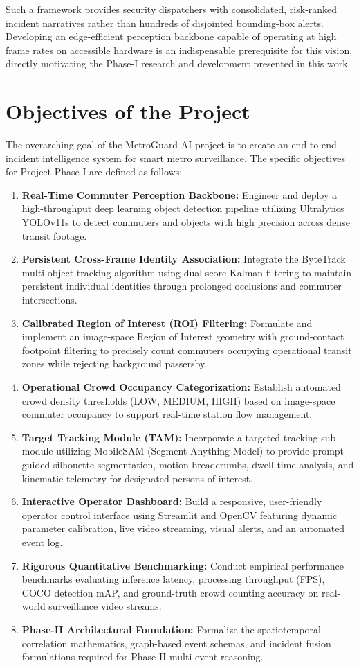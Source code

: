 \documentclass[12pt,a4paper]{report}
\begin{document}
Such a framework provides security dispatchers with consolidated, risk-ranked incident narratives rather than hundreds of disjointed bounding-box alerts. Developing an edge-efficient perception backbone capable of operating at high frame rates on accessible hardware is an indispensable prerequisite for this vision, directly motivating the Phase-I research and development presented in this work.

\section{Objectives of the Project}
The overarching goal of the MetroGuard AI project is to create an end-to-end incident intelligence system for smart metro surveillance. The specific objectives for Project Phase-I are defined as follows:
\begin{enumerate}
    \item \textbf{Real-Time Commuter Perception Backbone:} Engineer and deploy a high-throughput deep learning object detection pipeline utilizing Ultralytics YOLOv11s to detect commuters and objects with high precision across dense transit footage.
    \item \textbf{Persistent Cross-Frame Identity Association:} Integrate the ByteTrack multi-object tracking algorithm using dual-score Kalman filtering to maintain persistent individual identities through prolonged occlusions and commuter intersections.
    \item \textbf{Calibrated Region of Interest (ROI) Filtering:} Formulate and implement an image-space Region of Interest geometry with ground-contact footpoint filtering to precisely count commuters occupying operational transit zones while rejecting background passersby.
    \item \textbf{Operational Crowd Occupancy Categorization:} Establish automated crowd density thresholds (LOW, MEDIUM, HIGH) based on image-space commuter occupancy to support real-time station flow management.
    \item \textbf{Target Tracking Module (TAM):} Incorporate a targeted tracking sub-module utilizing MobileSAM (Segment Anything Model) to provide prompt-guided silhouette segmentation, motion breadcrumbs, dwell time analysis, and kinematic telemetry for designated persons of interest.
    \item \textbf{Interactive Operator Dashboard:} Build a responsive, user-friendly operator control interface using Streamlit and OpenCV featuring dynamic parameter calibration, live video streaming, visual alerts, and an automated event log.
    \item \textbf{Rigorous Quantitative Benchmarking:} Conduct empirical performance benchmarks evaluating inference latency, processing throughput (FPS), COCO detection mAP, and ground-truth crowd counting accuracy on real-world surveillance video streams.
    \item \textbf{Phase-II Architectural Foundation:} Formalize the spatiotemporal correlation mathematics, graph-based event schemas, and incident fusion formulations required for Phase-II multi-event reasoning.
\end{enumerate}
\end{document}
